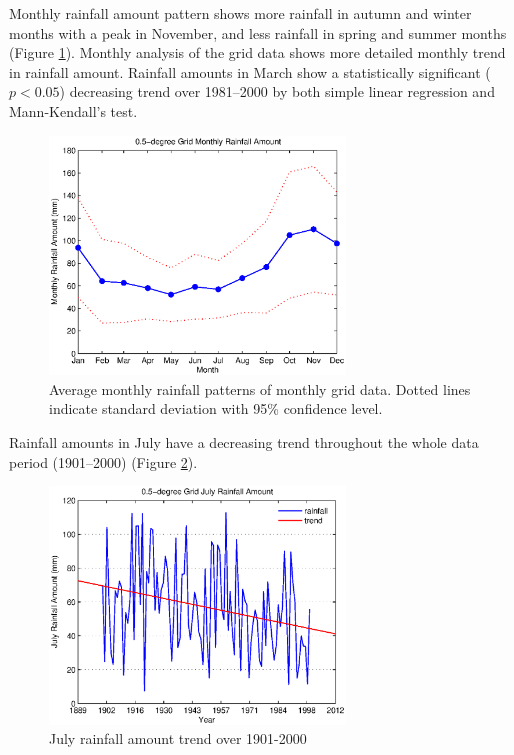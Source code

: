Monthly rainfall amount pattern shows more rainfall in autumn and winter months
with a peak in November, and less rainfall in spring and summer months (Figure
\ref{fig:grid_average_monthly}). Monthly analysis of the grid data shows more
detailed monthly trend in rainfall amount. Rainfall amounts in March show a
statistically significant ($p<0.05$) decreasing trend over 1981--2000 by both
simple linear regression and Mann-Kendall's test.

\begin{figure}[htbp]
  \centering
    \includegraphics[width=0.7\textwidth]{./img/grid_average_monthly}
  \caption[Average monthly rainfall patterns of monthly grid data]{Average
monthly rainfall patterns of monthly grid data. Dotted lines indicate standard
deviation with 95\% confidence level.}
  \label{fig:grid_average_monthly}
\end{figure}

Rainfall amounts in July have a decreasing trend throughout the whole data
period (1901--2000) (Figure \ref{fig:grid_july_trend}).

\begin{figure}
  \centering
    \includegraphics[width=0.7\textwidth]{./img/grid_july_trend}
  \caption{July rainfall amount trend over 1901-2000}
  \label{fig:grid_july_trend}
\end{figure}

